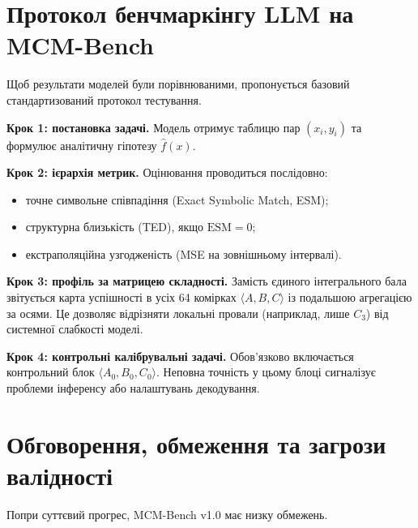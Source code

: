 \documentclass[11pt]{article}
\begin{document}
\section{Протокол бенчмаркінгу LLM на MCM-Bench}

Щоб результати моделей були порівнюваними, пропонується базовий стандартизований протокол тестування.

\textbf{Крок 1: постановка задачі.}
Модель отримує таблицю пар $(x_i,y_i)$ та формулює аналітичну гіпотезу $\hat f(x)$.

\textbf{Крок 2: ієрархія метрик.}
Оцінювання проводиться послідовно:
\begin{itemize}[leftmargin=1.5em]
  \item точне символьне співпадіння (Exact Symbolic Match, ESM);
  \item структурна близькість (TED), якщо $\mathrm{ESM}=0$;
  \item екстраполяційна узгодженість (MSE на зовнішньому інтервалі).
\end{itemize}

\textbf{Крок 3: профіль за матрицею складності.}
Замість єдиного інтегрального бала звітується карта успішності в усіх 64 комірках $\langle A,B,C\rangle$ із подальшою агрегацією за осями. Це дозволяє відрізняти локальні провали (наприклад, лише $C_3$) від системної слабкості моделі.

\textbf{Крок 4: контрольні калібрувальні задачі.}
Обов'язково включається контрольний блок $\langle A_0,B_0,C_0\rangle$. Неповна точність у цьому блоці сигналізує проблеми інференсу або налаштувань декодування.

\section{Обговорення, обмеження та загрози валідності}

Попри суттєвий прогрес, MCM-Bench v1.0 має низку обмежень.
\end{document}
